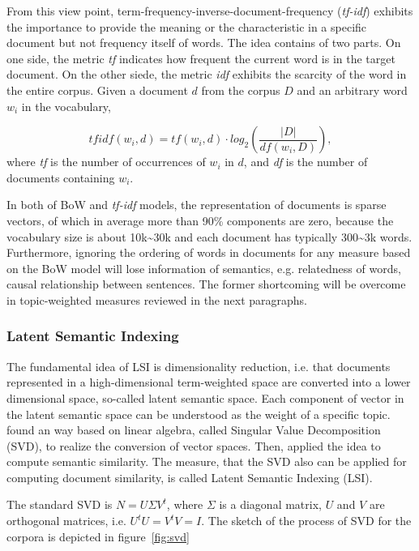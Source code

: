 From this view point, term-frequency-inverse-document-frequency (\textit{tf-idf}) exhibits the importance to provide the meaning or the characteristic in a specific document but not frequency itself of words. The idea contains of two parts. On one side, the metric \textit{tf} indicates how frequent the current word is in the target document. On the other siede, the metric \textit{idf} exhibits the scarcity of the word in the entire corpus. Given a document $d$ from the corpus $D$ and an arbitrary word $w_i$ in the vocabulary, 

\begin{equation}
    tfidf(w_i, d) = tf(w_i, d) \cdot log_2(\frac{|D|}{df(w_i, D)}), 
\end{equation}
where \textit{tf} is the number of occurrences of $w_i$ in $d$, and \textit{df} is the number of documents containing $w_i$. 

In both of BoW and \textit{tf-idf} models, the representation of documents is sparse vectors, of which in average more than 90\% components are zero,  because the vocabulary size is about 10k\textasciitilde 30k and each document has typically 300\textasciitilde 3k words. Furthermore, ignoring the ordering of words in documents for any measure based on the BoW model will lose information of semantics, e.g. relatedness of words, causal relationship between sentences. The former shortcoming will be overcome in topic-weighted measures reviewed in the next paragraphs. 

\subsubsection{Latent Semantic Indexing}

The fundamental idea of LSI is dimensionality reduction, i.e. that documents represented in a high-dimensional term-weighted space are converted into a lower dimensional space, so-called latent semantic space. Each component of vector in the latent semantic space can be understood as the weight of a specific topic.  \cite{Deerwester1990vi} found an way based on linear algebra, called Singular Value Decomposition (SVD), to realize the conversion of vector spaces. Then, \cite{landauer1998introduction} applied the idea to compute semantic similarity. The measure, that the SVD also can be applied for computing document similarity, is called Latent Semantic Indexing (LSI). 

The standard SVD is $N=U\Sigma V^t$, where $\Sigma$ is a diagonal matrix, $U$ and $V$ are orthogonal matrices, i.e. $U^tU=V^tV=I$. The sketch of the process of SVD for the corpora is depicted in figure~\ref{fig:svd} 

